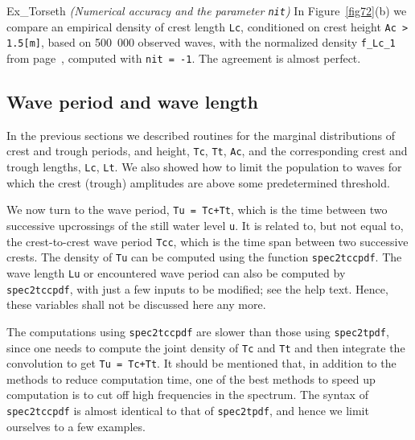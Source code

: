 \begin{cex}{Ex_Torseth} {\sl (Numerical accuracy and the parameter {\tt nit})}
In Figure~\ref{fig72}(b) we compare an empirical density of crest length
{\tt Lc}, conditioned on crest height {\tt Ac > 1.5[m]}, based on 
 500~000 observed waves, with the normalized
density {\tt f\_Lc\_1} from page~\pageref{fig71}, computed with
{\tt nit = -1}. The agreement is almost perfect.
\end{cex}

\subsection{Wave period and wave length}

In the previous sections we described routines for the marginal
distributions of crest and trough periods, and height, {\tt Tc},
{\tt Tt}, {\tt Ac},  and
the corresponding crest and trough lengths, {\tt Lc}, {\tt Lt}.
We also showed how to limit the population to waves for which
the crest (trough) amplitudes are above some predetermined threshold.

We now turn to the wave period,  {\tt Tu = Tc+Tt}, which is the time
between two successive upcrossings of the still water level {\tt u}.
It is related to, but not equal to,
the crest-to-crest wave period {\tt Tcc}, which is
the time span between two successive crests. The density of {\tt Tu}
can be computed using the function
{\tt spec2tccpdf}.
The wave length {\tt Lu} or encountered wave period
can also be computed by {\tt spec2tccpdf},
with just a few inputs to be modified; see the help text.
Hence, these variables shall not be discussed here any more.

The computations using {\tt spec2tccpdf} are slower than those using
{\tt spec2tpdf}, since  one needs to compute the joint density of
{\tt Tc} and {\tt Tt} and then integrate the
convolution to get {\tt Tu = Tc+Tt}. 
It should be mentioned that, in addition to the methods to reduce
computation time, one of the best methods to speed up computation is to
cut off high frequencies in the spectrum.
The syntax of {\tt spec2tccpdf} is almost identical to that of
{\tt spec2tpdf}, and hence we limit ourselves to a few examples.

